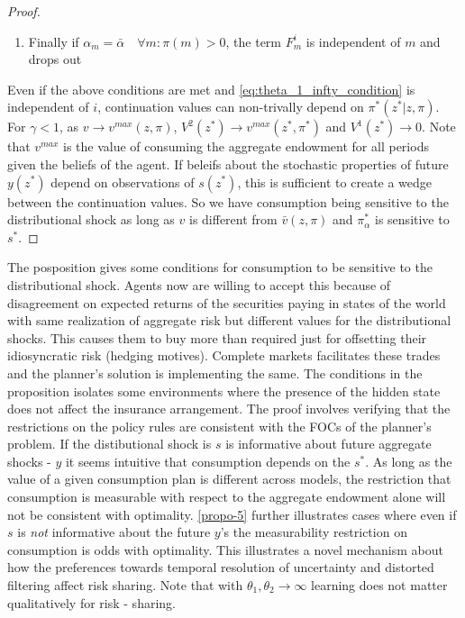 \documentclass[12pt]{article}
\begin{document}
\begin{proof}
\begin{enumerate}
\item Finally if $\alpha_m = \bar{\alpha} \quad \forall m : \pi(m) >0$, the term $F^i_m$ is independent of $m$ and drops out 

\end{enumerate}

Even if the above conditions are met and \ref{eq:theta_1_infty_condition} is independent of $i$, continuation values can non-trivally depend on $\pi^*(z^*|z,\pi)$. For $\gamma<1$, as $v \to v^{max}(z,\pi)$, $V^2(z^*)\to v^{max} (z^*,\pi^*)$ and $V^1(z^*) \to 0$. Note that $v^{max}$ is the value of consuming the aggregate endowment for all periods given the beliefs of the agent. If beleifs about the stochastic properties of future $y(z^*)$ depend on observations of $s(z^*)$, this is sufficient to create a wedge between the continuation values. So we have consumption being sensitive to the distributional shock as long as $v$ is different from $\bar{v}(z,\pi)$ and $\pi^*_{\alpha}$ is sensitive to $s^*$.
\end{proof}

\noindent The posposition gives some conditions for  consumption to be sensitive to the distributional shock. Agents now are willing to accept this because of disagreement on expected returns of the securities paying in states of the world with same realization of aggregate risk but different values for the distributional shocks. This causes them to buy more than required just for offsetting their idiosyncratic risk (hedging motives). Complete markets facilitates these trades and the planner's solution is implementing the same. The conditions in the proposition isolates some environments where the presence of the hidden state does not affect the insurance arrangement. The proof involves verifying that the restrictions on the policy rules are consistent with the FOCs of the planner's problem. If the distibutional shock is $s$ is informative about future aggregate shocks - $y$ it seems intuitive that consumption depends on the $s^*$. As long as the value of a given consumption plan is different across models, 
the restriction that consumption is measurable with respect to the aggregate endowment alone will not be consistent with optimality. \ref{propo-5} further illustrates cases where even if $s$ is \emph{not} informative about the future $y$'s the measurability restriction on consumption is odds with optimality. This illustrates a novel mechanism about how the preferences towards temporal resolution of uncertainty and distorted filtering affect risk sharing. Note that with $\theta_1,\theta_2 \to \infty$ learning does not matter qualitatively for risk - sharing. 
\end{document}
